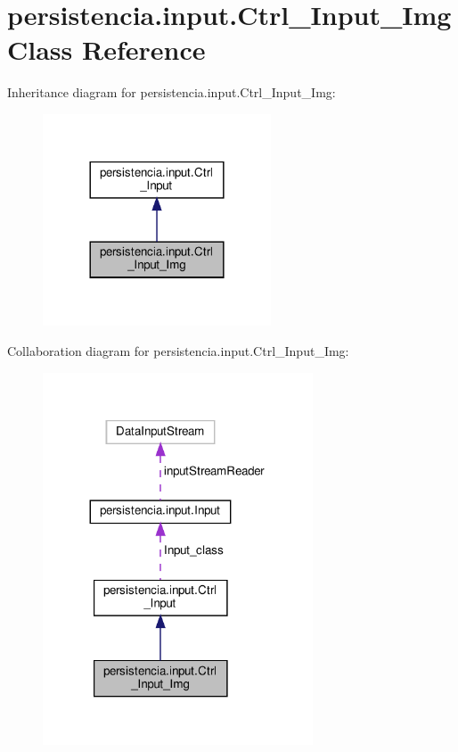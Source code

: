 \hypertarget{classpersistencia_1_1input_1_1Ctrl__Input__Img}{}\section{persistencia.\+input.\+Ctrl\+\_\+\+Input\+\_\+\+Img Class Reference}
\label{classpersistencia_1_1input_1_1Ctrl__Input__Img}


Inheritance diagram for persistencia.\+input.\+Ctrl\+\_\+\+Input\+\_\+\+Img\+:\nopagebreak
\begin{figure}[H]
\begin{center}
\leavevmode
\includegraphics[width=192pt]{classpersistencia_1_1input_1_1Ctrl__Input__Img__inherit__graph}
\end{center}
\end{figure}


Collaboration diagram for persistencia.\+input.\+Ctrl\+\_\+\+Input\+\_\+\+Img\+:
\nopagebreak
\begin{figure}[H]
\begin{center}
\leavevmode
\includegraphics[width=227pt]{classpersistencia_1_1input_1_1Ctrl__Input__Img__coll__graph}
\end{center}
\end{figure}
